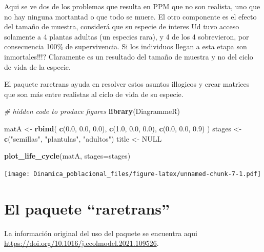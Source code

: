 \documentclass[
]{book}
\newenvironment{Shaded}{\begin{snugshade}}{\end{snugshade}}
\newcommand{\AttributeTok}[1]{\textcolor[rgb]{0.13,0.29,0.53}{#1}}
\newcommand{\CommentTok}[1]{\textcolor[rgb]{0.56,0.35,0.01}{\textit{#1}}}
\newcommand{\ConstantTok}[1]{\textcolor[rgb]{0.56,0.35,0.01}{#1}}
\newcommand{\FloatTok}[1]{\textcolor[rgb]{0.00,0.00,0.81}{#1}}
\newcommand{\FunctionTok}[1]{\textcolor[rgb]{0.13,0.29,0.53}{\textbf{#1}}}
\newcommand{\NormalTok}[1]{#1}
\newcommand{\OtherTok}[1]{\textcolor[rgb]{0.56,0.35,0.01}{#1}}
\newcommand{\StringTok}[1]{\textcolor[rgb]{0.31,0.60,0.02}{#1}}
\theoremstyle{definition}
\theoremstyle{definition}
\theoremstyle{definition}
\theoremstyle{definition}
\theoremstyle{remark}
\begin{document}
Aqui se ve dos de los problemas que resulta en PPM que no son realista, uno que no hay ninguna mortantad o que todo se muere. El otro componente es el efecto del tamaño de muestra, considerá que su especie de interes Ud tuvo acceso solamente a 4 plantas adultas (un especies rara), y 4 de los 4 sobrevieron, por consecuencia 100\% de supervivencia. Si los individuos llegan a esta etapa son inmortales!!!? Claramente es un resultado del tamaño de muestra y no del ciclo de vida de la especie.

El paquete raretrans ayuda en resolver estos asuntos illogicos y crear matrices que son más entre realistas al ciclo de vida de su especie.

\begin{Shaded}
\begin{Highlighting}[]
\CommentTok{\# hidden code to produce figures}
\FunctionTok{library}\NormalTok{(DiagrammeR)}


\NormalTok{matA }\OtherTok{\textless{}{-}} \FunctionTok{rbind}\NormalTok{(}
  \FunctionTok{c}\NormalTok{(}\FloatTok{0.0}\NormalTok{, }\FloatTok{0.0}\NormalTok{, }\FloatTok{0.0}\NormalTok{),}
  \FunctionTok{c}\NormalTok{(}\FloatTok{1.0}\NormalTok{, }\FloatTok{0.0}\NormalTok{, }\FloatTok{0.0}\NormalTok{),}
  \FunctionTok{c}\NormalTok{(}\FloatTok{0.0}\NormalTok{, }\FloatTok{0.0}\NormalTok{, }\FloatTok{0.9}\NormalTok{)}
\NormalTok{)}
\NormalTok{stages }\OtherTok{\textless{}{-}} \FunctionTok{c}\NormalTok{(}\StringTok{"semillas"}\NormalTok{, }\StringTok{"plantulas"}\NormalTok{, }\StringTok{"adultos"}\NormalTok{)}
\NormalTok{title }\OtherTok{\textless{}{-}} \ConstantTok{NULL}
\end{Highlighting}
\end{Shaded}

\begin{Shaded}
\begin{Highlighting}[]
\FunctionTok{plot\_life\_cycle}\NormalTok{(matA, }\AttributeTok{stages=}\NormalTok{stages)}
\end{Highlighting}
\end{Shaded}

\texttt{[image: Dinamica\_poblacional\_files/figure-latex/unnamed-chunk-7-1.pdf]}

\hypertarget{el-paquete-raretrans}{%
\section{El paquete ``raretrans''}\label{el-paquete-raretrans}}

La información original del uso del paquete se encuentra aqui \url{https://doi.org/10.1016/j.ecolmodel.2021.109526}.
\end{document}
